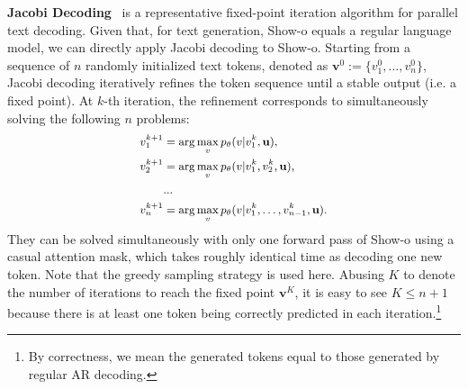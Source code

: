 \noindent \textbf{Jacobi Decoding}~\cite{santilli2023accelerating} is a representative fixed-point iteration algorithm for parallel text decoding.
Given that, for text generation, Show-o equals a regular language model, we can directly apply Jacobi decoding to Show-o.
Starting from a sequence of $n$ randomly initialized text tokens, denoted as $\mathbf{v}^{0} := \{ v_1^{0}, \dots, v_n^{0}\}$, Jacobi decoding iteratively refines the token sequence until a stable output (i.e. a fixed point). 
At $k$-th iteration, the refinement corresponds to simultaneously solving the following $n$ problems:
\begin{equation}\small
\begin{aligned}
    v_1^{k+1} &= \arg \max_v p_\theta(v | v_1^{k}, \mathbf{u}),\\
    v_2^{k+1} &= \arg \max_v p_\theta(v | v_1^{k}, v_2^{k}, \mathbf{u}),\\
    &...\\
    v_n^{k+1} &= \arg \max_v p_\theta(v | v_1^{k}, \dots, v_{n-1}^{k}, \mathbf{u}).
\end{aligned}
\end{equation}
They can be solved simultaneously with only one forward pass of Show-o using a casual attention mask, which takes roughly identical time as decoding one new token. 
Note that the greedy sampling strategy is used here. 
Abusing $K$ to denote the number of iterations to reach the fixed point $\mathbf{v}^{K}$, it is easy to see $K \leq n + 1$ because there is at least one token being correctly predicted in each iteration.\footnote{By correctness, we mean the generated tokens equal to those generated by regular AR decoding.}



